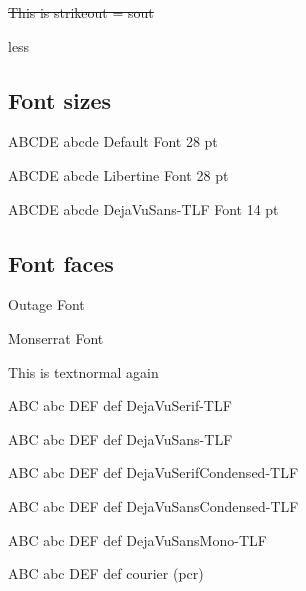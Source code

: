 
\sout{This is strikeout = sout}


less

\subsection{Font sizes}

{\fontsize{28pt}{1em}\selectfont ABCDE abcde Default Font 28 pt}

{\fontsize{28pt}{1em}\selectfont ABCDE abcde Libertine Font 28 pt}

\par

{\fontsize{14pt}{1em}\selectfont ABCDE abcde DejaVuSans-TLF Font 14 pt}


\par


\subsection{Font faces}

{Outage Font} %

{Monserrat Font} %

\textnormal{This is textnormal again}

{ABC abc DEF def DejaVuSerif-TLF}\par

{ABC abc DEF def DejaVuSans-TLF}\par

{ABC abc DEF def DejaVuSerifCondensed-TLF}\par

{ABC abc DEF def DejaVuSansCondensed-TLF}\par

{ABC abc DEF def DejaVuSansMono-TLF}\par

{\fontsize{12pt}{1em}\selectfont ABC abc DEF def courier (pcr)}\par

